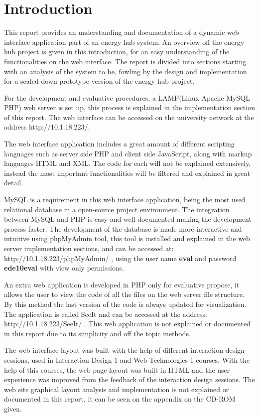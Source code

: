 \section{Introduction}
This report provides an understanding and documentation of a dynamic web interface application part of an energy hub system. An overview off the energy hub project is given in this introduction, for an easy understanding of the functionalities on the web interface. The report is divided into sections starting with an analysis of the system to be, fowling by the design and implementation for a scaled down prototype version of the energy hub project. 

For the development and evaluative procedures, a LAMP(Linux Apache MySQL PHP) web server is set up, this process is explained in the implementation section of this report. The web interface can be accessed on the university network at the address http://10.1.18.223/.

The web interface application includes a great amount of different scripting languages such as server side PHP and client side JavaScript, along with markup languages HTML and XML. The code for each will not be explained extensively, instead the most important functionalities will be filtered and explained in great detail.

MySQL is a requirement in this web interface application, being the most used relational database in a open-source project environment. The integration between MySQL and PHP is easy and well documented making the development process faster. The development of the database is made more interactive and intuitive using phpMyAdmin tool, this tool is installed and explained in the web server implementation sections, and can be accessed at: http://10.1.18.223/phpMyAdmin/ , using the user name \textbf{eval} and password \textbf{ede10eval} with view only permissions.

An extra web application is developed in PHP only for evaluative propose, it allows the user to view the code of all the files on the web server file structure. By this method the last version of the code is always updated for visualization. The application is called SeeIt and can be accessed at the address: http://10.1.18.223/SeeIt/ . This web application is not explained or documented in this report due to its simplicity and off the topic methods.

The web interface layout was built with the help of different interaction design sessions, used in Interaction Design 1 and Web Technologies 1 courses. With the help of this courses, the web page layout was built in HTML and the user experience was improved from the feedback of the interaction design sessions. The web site graphical layout analysis and implementation is not explained or documented in this report, it can be seen on the appendix on the CD-ROM given.

